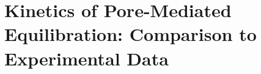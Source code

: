 \documentclass[10pt, a4paper]{article}
\begin{document}






\pagebreak
\section{Kinetics of Pore-Mediated Equilibration: Comparison to Experimental Data}
\end{document}
